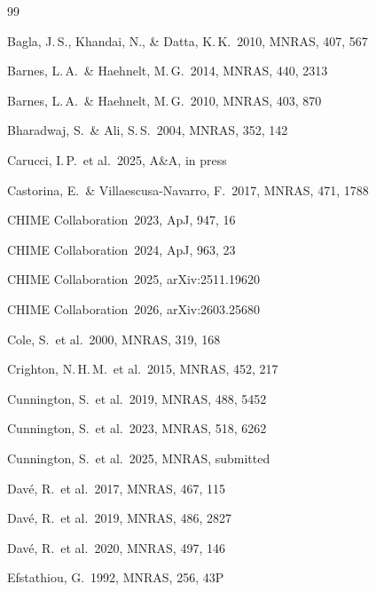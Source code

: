 \documentclass[10pt,a4paper]{article}
\begin{document}
\begin{thebibliography}{99}

Bagla, J.\,S., Khandai, N., \& Datta, K.\,K.\ 2010, MNRAS, 407, 567

Barnes, L.\,A.\ \& Haehnelt, M.\,G.\ 2014, MNRAS, 440, 2313

Barnes, L.\,A.\ \& Haehnelt, M.\,G.\ 2010, MNRAS, 403, 870

Bharadwaj, S.\ \& Ali, S.\,S.\ 2004, MNRAS, 352, 142

Carucci, I.\,P.\ et al.\ 2025, A\&A, in press

Castorina, E.\ \& Villaescusa-Navarro, F.\ 2017, MNRAS, 471, 1788

CHIME Collaboration\ 2023, ApJ, 947, 16

CHIME Collaboration\ 2024, ApJ, 963, 23

CHIME Collaboration\ 2025, arXiv:2511.19620

CHIME Collaboration\ 2026, arXiv:2603.25680

Cole, S.\ et al.\ 2000, MNRAS, 319, 168

Crighton, N.\,H.\,M.\ et al.\ 2015, MNRAS, 452, 217

Cunnington, S.\ et al.\ 2019, MNRAS, 488, 5452

Cunnington, S.\ et al.\ 2023, MNRAS, 518, 6262

Cunnington, S.\ et al.\ 2025, MNRAS, submitted

Dav{\'e}, R.\ et al.\ 2017, MNRAS, 467, 115

Dav{\'e}, R.\ et al.\ 2019, MNRAS, 486, 2827

Dav{\'e}, R.\ et al.\ 2020, MNRAS, 497, 146

Efstathiou, G.\ 1992, MNRAS, 256, 43P


\end{thebibliography}
\end{document}
